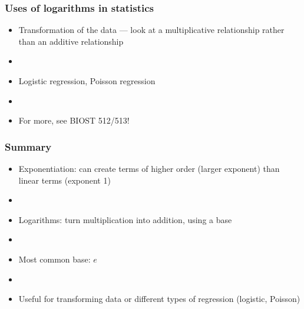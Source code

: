 \documentclass[12pt]{beamer}
\newcommand{\myframe}[1]{\begin{frame} \frametitle{#1}}
\begin{document}
\myframe{Uses of logarithms in statistics}
\begin{itemize}
\item Transformation of the data --- look at a multiplicative relationship rather than an additive relationship
\item[]
\item Logistic regression, Poisson regression
\item[]
\item For more, see BIOST 512/513!
\end{itemize}
\end{frame}

\myframe{Summary}
\begin{itemize}
\item Exponentiation: can create terms of higher order (larger exponent) than linear terms (exponent 1)
\item[]
\item Logarithms: turn multiplication into addition, using a base
\item[]
\item Most common base: $e$
\item[]
\item Useful for transforming data or different types of regression (logistic, Poisson)
\end{itemize}
\end{frame}
\end{document}
